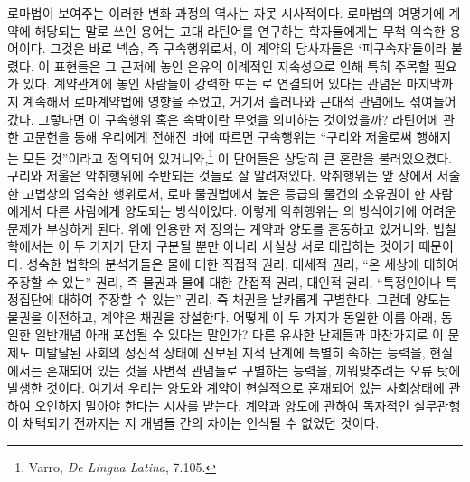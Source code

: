 로마법이 보여주는 이러한 변화 과정의 역사는 자못 시사적이다.
로마법의 여명기에
계약에 해당되는 말로 쓰인 용어는
고대 라틴어를 연구하는 학자들에게는 무척 익숙한 용어이다.
그것은 바로 넥숨, 즉 구속행위로서,
이 계약의 당사자들은 `피구속자'들이라 불렸다.
이 표현들은 그 근저에 놓인 은유의 이례적인 지속성으로 인해
특히 주목할 필요가 있다.
계약관계에 놓인 사람들이 강력한 
또는 로 연결되어 있다는
관념은 마지막까지 계속해서 로마계약법에 영향을 주었고,
거기서 흘러나와 근대적 관념에도 섞여들어갔다.
그렇다면 이 구속행위 혹은 속박이란 무엇을 의미하는 것이었을까?
라틴어에 관한 고문헌을 통해 우리에게 전해진 바에 따르면
구속행위는 ``구리와 저울로써 행해지는
모든 것''이라고
정의되어 있거니와,\footnote{%
  \latinmarks
  Varro, \textit{De Lingua Latina}, 7.105.
  }
이 단어들은 상당히 큰 혼란을 불러있으켰다.
구리와 저울은
악취행위에 수반되는 것들로 잘 알려져있다.
악취행위는
앞 장에서 서술한 고법상의 엄숙한 행위로서,
로마 물권법에서 높은 등급의 물건의 소유권이
한 사람에게서 다른 사람에게 양도되는 방식이었다.
이렇게 악취행위는 의 방식이기에
어려운 문제가 부상하게 된다.
위에 인용한 저 정의는
계약과 양도를 혼동하고 있거니와,
법철학에서는 이 두 가지가 단지 구분될 뿐만 아니라
사실상 서로 대립하는 것이기 때문이다.
성숙한 법학의 분석가들은
물에 대한 직접적 권리,
대세적 권리,
``온 세상에 대하여 주장할 수 있는'' 권리,
즉 물권과
물에 대한 간접적 권리,
대인적 권리,
``특정인이나 특정집단에 대하여 주장할 수 있는'' 권리,
즉 채권을
날카롭게 구별한다.
그런데 양도는 물권을 이전하고, 계약은 채권을 창설한다.
어떻게 이 두 가지가 동일한 이름 아래, 동일한 일반개념 아래
포섭될 수 있다는 말인가?
다른 유사한 난제들과 마찬가지로 이 문제도
미발달된 사회의 정신적 상태에
진보된 지적 단계에 특별히 속하는 능력을,
현실에서는 혼재되어 있는 것을 사변적 관념들로 구별하는 능력을,
끼워맞추려는
오류 탓에 발생한 것이다.
여기서
우리는
양도와 계약이 현실적으로 혼재되어 있는 사회상태에 관하여
오인하지 말아야 한다는 시사를 받는다.
계약과 양도에 관하여 독자적인 실무관행이 채택되기 전까지는
저 개념들 간의 차이는 인식될 수 없었던 것이다.

